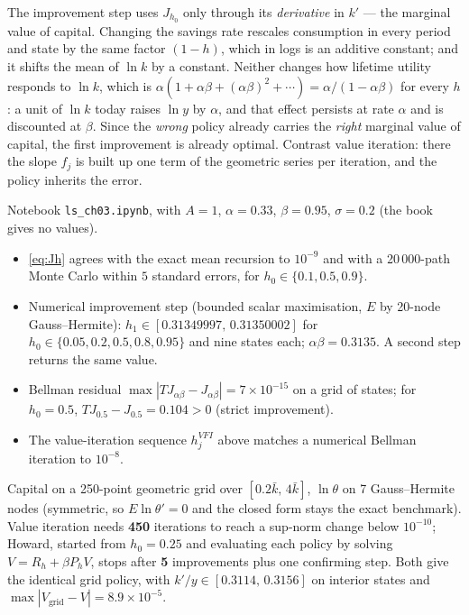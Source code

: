 \documentclass[12pt, letterpaper]{article}
\begin{document}
\begin{tcolorbox}[oddbox,title={Exercise 3.1 \quad Howard's policy iteration algorithm}]
\begin{tcolorbox}[theorybox,title={Why one step is enough}]
The improvement step uses $J_{h_0}$ only through its \emph{derivative} in $k'$ --- the marginal
value of capital. Changing the savings rate rescales consumption in every period and state by
the same factor $(1-h)$, which in logs is an additive constant; and it shifts the mean of
$\ln k$ by a constant. Neither changes how lifetime utility responds to $\ln k$, which is
$\alpha(1+\alpha\beta+(\alpha\beta)^2+\cdots)=\alpha/(1-\alpha\beta)$ for every $h$: a unit of
$\ln k$ today raises $\ln y$ by $\alpha$, and that effect persists at rate $\alpha$ and is
discounted at $\beta$. Since the \emph{wrong} policy already carries the \emph{right} marginal
value of capital, the first improvement is already optimal. Contrast value iteration: there the slope $f_j$ is
built up one term of the geometric series per iteration, and the policy inherits the error.
\end{tcolorbox}

\begin{tcolorbox}[databox]
Notebook \texttt{ls\_ch03.ipynb}, with $A=1$, $\alpha=0.33$, $\beta=0.95$, $\sigma=0.2$ (the
book gives no values).
\begin{itemize}[itemsep=1pt]
\item \eqref{eq:Jh} agrees with the exact mean recursion to $10^{-9}$ and with a 20\,000-path
Monte Carlo within $5$ standard errors, for $h_0\in\{0.1,0.5,0.9\}$.
\item Numerical improvement step (bounded scalar maximisation, $E$ by 20-node Gauss--Hermite):
$h_1\in[0.31349997,\,0.31350002]$ for $h_0\in\{0.05,0.2,0.5,0.8,0.95\}$ and nine states each;
$\alpha\beta=0.3135$. A second step returns the same value.
\item Bellman residual $\max|TJ_{\alpha\beta}-J_{\alpha\beta}|=7\times10^{-15}$ on a grid of
states; for $h_0=0.5$, $TJ_{0.5}-J_{0.5}=0.104>0$ (strict improvement).
\item The value-iteration sequence $h^{VFI}_j$ above matches a numerical Bellman iteration to
$10^{-8}$.
\end{itemize}
\end{tcolorbox}

\begin{tcolorbox}[databox,title={Discretised model --- see the companion notebook}]
Capital on a 250-point geometric grid over $[0.2\bar k,\,4\bar k]$, $\ln\theta$ on 7
Gauss--Hermite nodes (symmetric, so $E\ln\theta'=0$ and the closed form stays the exact
benchmark). Value iteration needs \textbf{450} iterations to reach a sup-norm change below
$10^{-10}$; Howard, started from $h_0=0.25$ and evaluating each policy by solving
$V=R_h+\beta P_hV$, stops after \textbf{5} improvements plus one confirming step. Both give the
identical grid policy, with $k'/y\in[0.3114,\,0.3156]$ on interior states and
$\max|V_{\text{grid}}-V|=8.9\times10^{-5}$.


\end{tcolorbox}
\end{tcolorbox}
\end{document}
